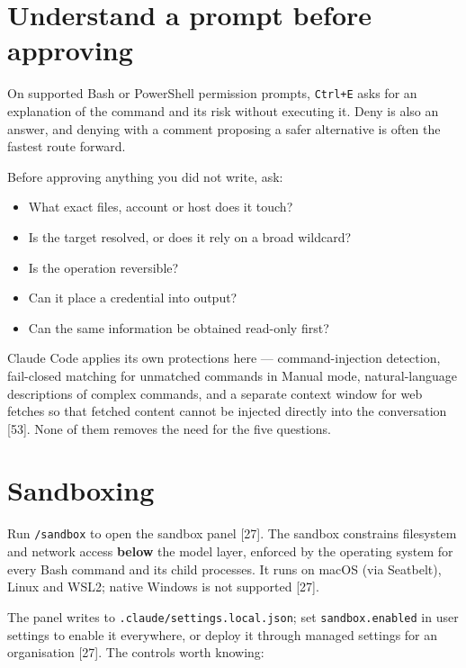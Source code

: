 \documentclass[11pt,a4paper,twoside,openany]{book}
\begin{document}
\FloatBarrier
\setcounter{section}{2}
\section{Understand a prompt before approving}

On supported Bash or PowerShell permission prompts, \texttt{Ctrl+E} asks for an explanation of the command and its risk without executing it. Deny is also an answer, and denying with a comment proposing a safer alternative is often the fastest route forward.


Before approving anything you did not write, ask:


\begin{itemize}
\item What exact files, account or host does it touch?
\item Is the target resolved, or does it rely on a broad wildcard?
\item Is the operation reversible?
\item Can it place a credential into output?
\item Can the same information be obtained read-only first?
\end{itemize}

Claude Code applies its own protections here — command-injection detection, fail-closed matching for unmatched commands in Manual mode, natural-language descriptions of complex commands, and a separate context window for web fetches so that fetched content cannot be injected directly into the conversation [53]. None of them removes the need for the five questions.


\FloatBarrier
\setcounter{section}{3}
\section{Sandboxing}

Run \texttt{/\allowbreak{}sandbox} to open the sandbox panel [27]. The sandbox constrains filesystem and network access \textbf{below} the model layer, enforced by the operating system for every Bash command and its child processes. It runs on macOS (via Seatbelt), Linux and WSL2; native Windows is not supported [27].


The panel writes to \texttt{.\allowbreak{}claude/\allowbreak{}settings.\allowbreak{}local.\allowbreak{}json}; set \texttt{sandbox.\allowbreak{}enabled} in user settings to enable it everywhere, or deploy it through managed settings for an organisation [27]. The controls worth knowing:
\end{document}
